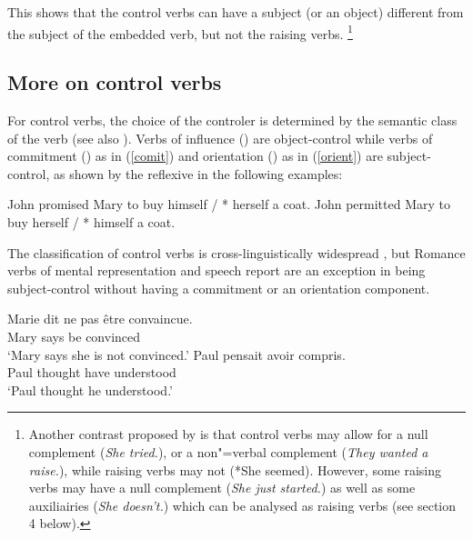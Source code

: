 \documentclass[output=paper
                ,modfonts
                ,nonflat
	        ,collection
	        ,collectionchapter
	        ,collectiontoclongg
 	        ,biblatex
                ,babelshorthands
                ,newtxmath
                ,draftmode
                ,colorlinks, citecolor=brown
]{./langsci/langscibook}
\begin{document}
\eal
{}
\zl

This shows that the control verbs can have a subject (or an object) different from the subject of the embedded verb, but not the raising verbs.
\footnote{Another contrast proposed by \citet{Jacobson1990} is that control verbs may allow for a null complement (\emph{She tried.}), or a non"=verbal complement (\emph{They wanted a raise.}), while raising verbs may not (*She seemed). However, some raising verbs may have a null complement (\emph{She just started.}) as well as some auxiliairies (\emph{She doesn't.}) which can be analysed as raising verbs (see section 4 below).}

\subsection{More on control verbs}

For control verbs, the choice of the controler is determined by the semantic class of the verb \citet{PollardandSag1992} (see also \citealt{JackendoffandCulicover2003}).  Verbs of influence () are object-control
while verbs of commitment () as in (\ref{comit}) and orientation () as in (\ref{orient}) are subject-control, as shown by the reflexive in the following examples:

\begin{exe}
	\ex \begin{xlist}
	\ex John promised Mary to buy himself / * herself a coat. \label{comit}
   \ex 	John permitted Mary to buy herself / * himself a coat.\label{orient}
 \end{xlist}
 \end{exe}
 
  The classification of control verbs is cross-linguistically widespread \citep{VanValinandLapolla1997}, but Romance verbs of mental representation and speech report are an exception in being subject-control without having a commitment or an orientation component.


\begin{exe}
\ex \begin{xlist}
\ex \gll Marie dit {ne pas} \^etre convaincue. \\
Mary says  be convinced \\
\glt `Mary says she is not convinced.'	
\ex \gll Paul pensait  avoir compris. \\
Paul thought have understood \\
\glt `Paul thought he understood.'
 \end{xlist}
\end{exe}
\end{document}
